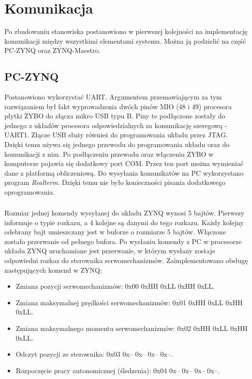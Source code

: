 \chapter{Komunikacja}
\label{cha:komunikacja}

Po zbudowaniu stanowiska postanowiono w pierwszej kolejności na implementację komunikacji między wszystkimi elementami systemu. Można ją podzielić na część PC-ZYNQ oraz ZYNQ-Maestro.

\section{PC-ZYNQ}
\label{sec:pc-zynq}
Postanowiono wykorzystać UART. Argumentem przemawiającym za tym rozwiązaniem był fakt wyprowadzenia dwóch pinów MIO (48 i 49) procesora płytki ZYBO do złącza mikro USB typu B. Piny te podłączone zostały do jednego z układów procesora odpowiedzialnych za komunikację szeregową - UART1. Złącze USB służy również do programowania układu przez JTAG. Dzięki temu używa się jednego przewodu do programowania układu oraz do komunikacji z nim. Po podłączeniu przewodu oraz włączeniu ZYBO w komputerze pojawia się dodatkowy port COM. Przez ten port można wymieniać dane z platformą obliczeniową. Do wysyłania komunikatów na PC wykorzystano program \textit{Realterm}. Dzięki temu nie było konieczności pisania dodatkowego oprogramowania.
\paragraph*{}
Rozmiar jednej komendy wysyłanej do układu ZYNQ wynosi 5 bajtów. Pierwszy informuje o typie rozkazu, a 4 kolejne są danymi do tego rozkazu. Każdy kolejny odebrany bajt umieszczany jest w buforze o rozmiarze 5 bajtów. Włączone zostało przerwanie od pełnego bufora. Po wysłaniu komendy z PC w procesorze układu ZYNQ uruchamiane jest przerwanie, w którym wysłany zostaje odpowiedni rozkaz do sterownika serwomechanizmów. Zaimplementowano obsługę następujących komend w ZYNQ:
\begin{itemize}
\item Zmiana pozycji serwomechanizmów: 0x00 0xHH 0xLL 0xHH 0xLL.
\item Zmiana maksymalnej prędkości serwomechanizmów: 0x01 0xHH 0xLL 0xHH 0xLL.
\item Zmiana maksymalnego momentu serwomechanizmów: 0x02 0xHH 0xLL 0xHH 0xLL.
\item Odczyt pozycji ze sterownika: 0x03 0x-- 0x-- 0x-- 0x--.
\item Rozpoczęcie pracy autonomicznej (śledzenia): 0x04 0x-- 0x-- 0x-- 0x--.
\end{itemize}
